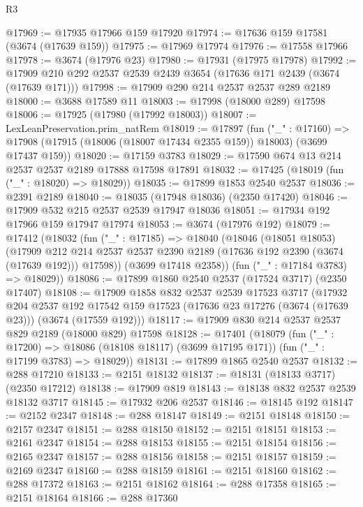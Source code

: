 \begin{lexlean}{R3}
\begin{coremodule}
@17969 := @17935 @17966 @159 @17920
@17974 := @17636 @159 @17581 (@3674 (@17639 @159))
@17975 := @17969 @17974
@17976 := @17558 @17966
@17978 := @3674 (@17976 @23)
@17980 := @17931 (@17975 @17978)
@17992 := @17909 @210 @292 @2537 @2539 @2439 @3654 (@17636 @171 @2439 (@3674 (@17639 @171)))
@17998 := @17909 @290 @214 @2537 @2537 @289 @2189
@18000 := @3688 @17589 @11
@18003 := @17998 (@18000 @289) @17598
@18006 := @17925 (@17980 (@17992 @18003))
@18007 := LexLeanPreservation.prim_natRem
@18019 := @17897
    (fun ("_" : @17160) =>
    @17908 (@17915 (@18006 (@18007 @17434 @2355 @159)) @18003) (@3699 @17437 @159))
@18020 := @17159 @3783
@18029 := @17590 @674 @13 @214 @2537 @2537 @2189 @17888 @17598 @17891
@18032 := @17425 (@18019 (fun ("_" : @18020) => @18029))
@18035 := @17899 @1853 @2540 @2537
@18036 := @2391 @2189
@18040 := @18035 (@17948 @18036) (@2350 @17420)
@18046 := @17909 @532 @215 @2537 @2539 @17947 @18036
@18051 := @17934 @192 @17966 @159 @17947 @17974
@18053 := @3674 (@17976 @192)
@18079 := @17412
    (@18032
      (fun ("_" : @17185) =>
      @18040
        (@18046
          (@18051 @18053)
          (@17909
            @212
            @214
            @2537
            @2537
            @2390
            @2189
            (@17636 @192 @2390 (@3674 (@17639 @192)))
            @17598))
        (@3699 @17418 @2358))
      (fun ("_" : @17184 @3783) => @18029))
@18086 := @17899 @1860 @2540 @2537 (@17524 @3717) (@2350 @17407)
@18108 := @17909
    @1858
    @832
    @2537
    @2539
    @17523
    @3717
    (@17932
      @204
      @2537
      @192
      @17542
      @159
      @17523
      (@17636 @23 @17276 (@3674 (@17639 @23)))
      (@3674 (@17559 @192)))
@18117 := @17909 @830 @214 @2537 @2537 @829 @2189 (@18000 @829) @17598
@18128 := @17401
    (@18079
      (fun ("_" : @17200) => @18086 (@18108 @18117) (@3699 @17195 @171))
      (fun ("_" : @17199 @3783) => @18029))
@18131 := @17899 @1865 @2540 @2537
@18132 := @288 @17210
@18133 := @2151 @18132
@18137 := @18131 (@18133 @3717) (@2350 @17212)
@18138 := @17909 @819
@18143 := @18138 @832 @2537 @2539 @18132 @3717
@18145 := @17932 @206 @2537
@18146 := @18145 @192
@18147 := @2152 @2347
@18148 := @288 @18147
@18149 := @2151 @18148
@18150 := @2157 @2347
@18151 := @288 @18150
@18152 := @2151 @18151
@18153 := @2161 @2347
@18154 := @288 @18153
@18155 := @2151 @18154
@18156 := @2165 @2347
@18157 := @288 @18156
@18158 := @2151 @18157
@18159 := @2169 @2347
@18160 := @288 @18159
@18161 := @2151 @18160
@18162 := @288 @17372
@18163 := @2151 @18162
@18164 := @288 @17358
@18165 := @2151 @18164
@18166 := @288 @17360

\end{coremodule}
\end{lexlean}
